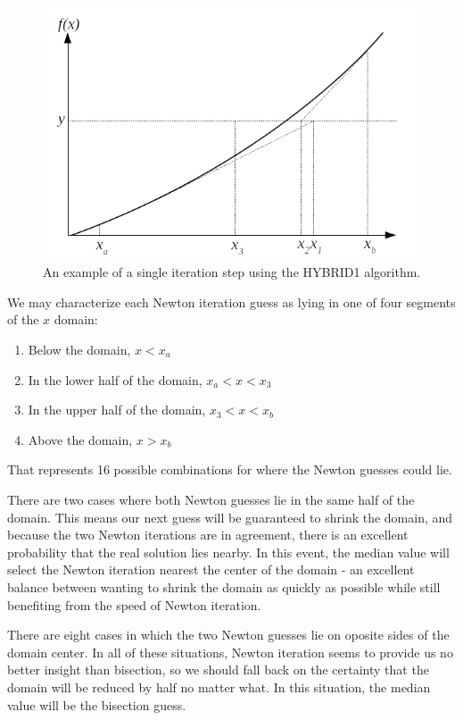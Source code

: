 \documentclass{article}
\begin{document}
\begin{figure}
\centering
\includegraphics[width = 0.8\linewidth]{figures/1d_hybrid}
\caption{An example of a single iteration step using the HYBRID1 algorithm.}\label{fig:1d:hybrid}
\end{figure}

We may characterize each Newton iteration guess as lying in one of four segments of the $x$ domain:
\begin{enumerate}
\item Below the domain, $x < x_a$
\item In the lower half of the domain, $x_a < x < x_3$
\item In the upper half of the domain, $x_3 < x < x_b$
\item Above the domain, $x > x_b$
\end{enumerate}
That represents 16 possible combinations for where the Newton guesses could lie.

There are two cases where both Newton guesses lie in the same half of the domain.  This means our next guess will be guaranteed to shrink the domain, and because the two Newton iterations are in agreement, there is an excellent probability that the real solution lies nearby.  In this event, the median value will select the Newton iteration nearest the center of the domain - an excellent balance between wanting to shrink the domain as quickly as possible while still benefiting from the speed of Newton iteration.

There are eight cases in which the two Newton guesses lie on oposite sides of the domain center.  In all of these situations, Newton iteration seems to provide us no better insight than bisection, so we should fall back on the certainty that the domain will be reduced by half no matter what.  In this situation, the median value will be the bisection guess.
\end{document}
